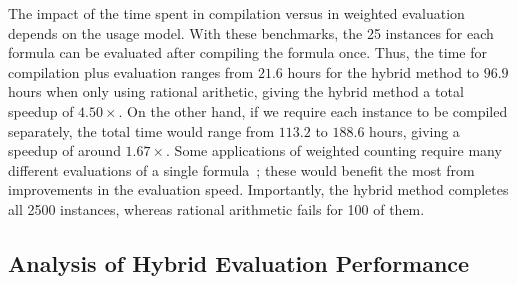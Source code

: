 \documentclass[
hf
]{ceurart}
\begin{document}
The impact of the time spent in compilation versus in weighted
evaluation depends on the usage model.  With these benchmarks, the 25
instances for each formula can be evaluated after compiling the
formula once.  Thus, the time for compilation plus evaluation ranges
from $21.6$ hours for the hybrid method to $96.9$ hours when only
using rational arithetic, giving the hybrid method a total speedup of
$4.50\times$.  On the other hand, if we require each instance to be
compiled separately, the total time would range from $113.2$ to
$188.6$ hours, giving a speedup of around $1.67\times$.  Some
applications of weighted counting require many different evaluations
of a single formula~\cite{sundermann:tsem:2024}; these would benefit
the most from improvements in the evaluation speed. Importantly, the
hybrid method completes all 2500 instances, whereas rational
arithmetic fails for 100 of them.

\subsection{Analysis of Hybrid Evaluation Performance}
\label{app:performance}
\end{document}
